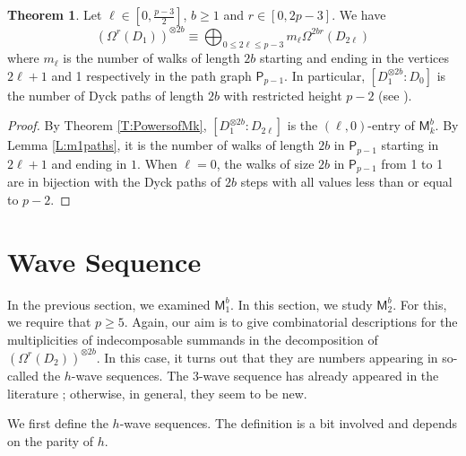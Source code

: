 \documentclass[12pt,reqno]{amsart}
\renewcommand{\geq}{\geqslant}
\renewcommand{\leq}{\leqslant}
\newcommand{\M}{\mathsf{M}}
\theoremstyle{definition}
\newtheorem{thm}{Theorem}[section]
\numberwithin{equation}{section}
\begin{document}
\begin{thm}\label{T:D1powers}
    Let $\ell\in [0,\frac{p-3}{2}]$, $b\geq 1$ and $r\in [0,2p-3]$. We have \[(\Omega^r(D_1))^{\otimes 2b}\equiv \bigoplus_{0\leq 2\ell\leq p-3}m_\ell \Omega^{2br}(D_{2\ell})\] where $m_\ell$ is the number of walks of length $2b$ starting and ending in the vertices $2\ell+1$ and 1 respectively in the path graph $\mathsf{P}_{p-1}$. In particular, $[D_1^{\otimes 2b} : D_0]$ is the number of Dyck paths of length $2b$ with restricted height $p-2$ (see \cite[A080934]{OEIS}).
\end{thm}
\begin{proof}
    By Theorem \ref{T:PowersofMk}, $[D_1^{\otimes 2b} : D_{2\ell}]$ is the $(\ell,0)$-entry of $\M_k^b$. By Lemma \ref{L:m1paths}, it is the number of walks of length $2b$ in $\mathsf{P}_{p-1}$ starting in $2\ell+1$ and ending in $1$. When $\ell=0$, the walks of size $2b$ in $\mathsf{P}_{p-1}$ from 1 to 1 are in bijection with the Dyck paths of $2b$ steps with all values less than or equal to $p-2$.
\end{proof}

	

\section{Wave Sequence}\label{S:Wave}

In the previous section, we examined $\M_1^b$. In this section, we study $\M_2^b$. For this, we require that $p\geq 5$. Again, our aim is to give combinatorial descriptions for the multiplicities of indecomposable summands in the decomposition of $(\Omega^r(D_2))^{\otimes 2b}$. In this case, it turns out that they are numbers appearing in so-called the $h$-wave sequences. The 3-wave sequence has already appeared in the literature \cite[A038196]{OEIS}; otherwise, in general, they seem to be new. 

We first define the $h$-wave sequences. The definition is a bit involved and depends on the parity of $h$.
\end{document}
